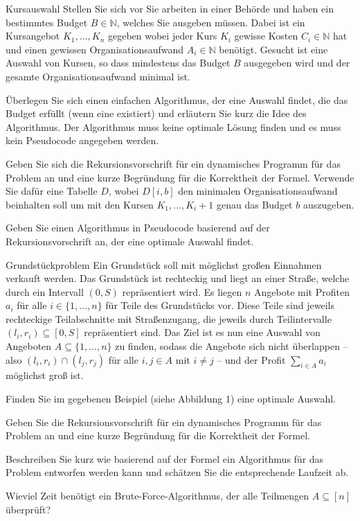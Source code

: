 \documentclass{exercisesheet}
\begin{document}
\begin{eexercises}{Kursauswahl}{
    Stellen Sie sich vor Sie arbeiten in einer Behörde und haben ein bestimmtes Budget $B \in \mathbb{N}$, welches Sie ausgeben müssen. Dabei ist ein Kursangebot $K_1, \ldots, K_n$ gegeben wobei jeder Kurs $K_i$ gewisse Kosten $C_i \in \mathbb{N}$ hat und einen gewissen Organisationsaufwand $A_i \in \mathbb{N}$ benötigt. Gesucht ist eine Auswahl von Kursen, so dass mindestens das Budget $B$ ausgegeben wird und der gesamte Organisationsaufwand minimal ist.
  }
  \item Überlegen Sie sich einen einfachen Algorithmus, der eine Auswahl findet, die das Budget erfüllt (wenn eine existiert) und erläutern Sie kurz die Idee des Algorithmus. Der Algorithmus muss keine optimale Lösung finden und es muss kein Pseudocode angegeben werden.
  \item Geben Sie sich die Rekursionsvorschrift für ein dynamisches Programm für das Problem an und eine kurze Begründung für die Korrektheit der Formel. Verwende Sie dafür eine Tabelle $D$, wobei $D[i, b]$ den minimalen Organisationsaufwand beinhalten soll um mit den Kursen $K_1, \ldots, K_i+1$ genau das Budget $b$ auszugeben.
  \item Geben Sie einen Algorithmus in Pseudocode basierend auf der Rekursionsvorschrift an, der eine optimale Auswahl findet.
\end{eexercises}

\begin{eexercises}{Grundstückproblem}{
    Ein Grundstück soll mit möglichst großen Einnahmen verkauft werden. Das Grundstück ist rechteckig und liegt an einer Straße, welche durch ein Intervall $(0, S)$ repräsentiert wird. Es liegen $n$ Angebote mit Profiten $a_i$ für alle $i \in \{1, \ldots, n\}$ für Teile des Grundstücks vor. Diese Teile sind jeweils rechteckige Teilabschnitte mit Straßenzugang, die jeweils durch Teilintervalle $(l_i, r_i) \subseteq [0, S]$ repräsentiert sind. Das Ziel ist es nun eine Auswahl von Angeboten $A \subseteq \{1, \ldots, n\}$ zu finden, sodass die Angebote sich nicht überlappen – also $(l_i, r_i) \cap (l_j, r_j)$ für alle $i,j \in A$ mit $i \neq j$ – und der Profit $\sum_{i \in A} a_i$ möglichst groß ist.
  }
  \item Finden Sie im gegebenen Beispiel (siehe Abbildung 1) eine optimale Auswahl.
  \item Geben Sie die Rekursionsvorschrift für ein dynamisches Programm für das Problem an und eine kurze Begründung für die Korrektheit der Formel.
  \item Beschreiben Sie kurz wie basierend auf der Formel ein Algorithmus für das Problem entworfen werden kann und schätzen Sie die entsprechende Laufzeit ab.
  \item Wieviel Zeit benötigt ein Brute-Force-Algorithmus, der alle Teilmengen $A \subseteq [n]$ überprüft?
\end{eexercises}
\end{document}
